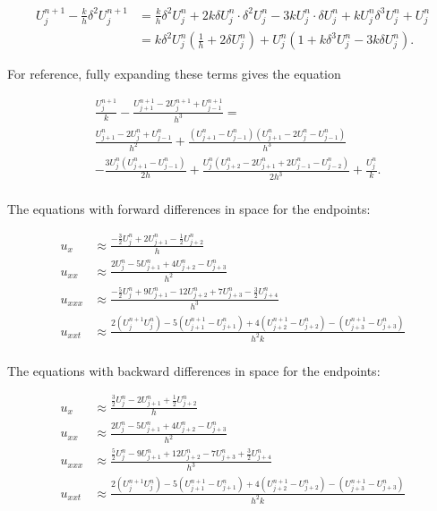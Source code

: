 \documentclass[fleqn]{article}
\begin{document}
\begin{align*}
U_j^{n+1} - \frac{k}{h} \delta^2 U_j^{n+1} &= \frac{k}{h} \delta^2 U_j^n + 2k\delta U_j^n \cdot \delta ^2U_j^n - 3 k U_j^n \cdot \delta U_j^n + k U_j^n \delta^3 U_j^n + U_j^n \\
&= k \delta^2 U_j^n \left( \frac{1}{h} + 2 \delta U_j^n \right) + U_j^n \left(1 + k \delta^3 U_j^n - 3 k \delta U_j^n \right).
\end{align*}

For reference, fully expanding these terms gives the equation

\begin{align*}
&\frac{U_{j}^{n+1}}{k} - \frac{U_{j+1}^{n+1}-2U_{j}^{n+1}+U_{j-1}^{n+1}}{h^{3}} = \\
&\frac{U_{j+1}^n - 2U_j^n + U_{j-1}^n}{h^2} +\frac{\left(U_{j+1}^n-U_{j-1}^n\right)\left(U_{j+1}^n-2U_{j}^n-U_{j-1}^n\right)}{h^{3}}\\
&-\frac{3U_{j}^n\left(U_{j+1}^n-U_{j-1}^n\right)}{2h} +\frac{U_{j}^n\left(U_{j+2}^n-2U_{j+1}^n+2U_{j-1}^n-U_{j-2}^n\right)}{2h^{3}} +\frac{U_{j}^n}{k}.\\
\end{align*}

\newpage
The equations with forward differences in space for the endpoints:

\begin{align*}
u_x &\approx \frac{-\frac{3}{2}U_j^n+2U_{j+1}^n-\frac{1}{2}U_{j+2}^n}{h} \\
u_{xx} &\approx \frac{2U_j^n-5U_{j+1}^n+4U_{j+2}^n-U_{j+3}^n}{h^{2}} \\
u_{xxx} &\approx \frac{-\frac{5}{2}U_j^n+9U_{j+1}^n-12U_{j+2}^n+7U_{j+3}^n-\frac{3}{2}U_{j+4}^n}{h^{3}} \\
u_{xxt} &\approx \frac{2\left(U_j^{n+1}U_j^n\right)-5\left(U_{j+1}^{n+1}-U_{j+1}^{n}\right)+4\left(U_{j+2}^{n+1}-U_{j+2}^n\right)-\left(U_{j+3}^{n+1}-U_{j+3}^n\right)}{h^{2}k} \\
\end{align*}

The equations with backward differences in space for the endpoints:

\begin{align*}
u_x &\approx \frac{\frac{3}{2}U_j^n-2U_{j+1}^n+\frac{1}{2}U_{j+2}^n}{h} \\
u_{xx} &\approx \frac{2U_j^n-5U_{j+1}^n+4U_{j+2}^n-U_{j+3}^n}{h^{2}} \\
u_{xxx} &\approx \frac{\frac{5}{2}U_j^n-9U_{j+1}^n+12U_{j+2}^n-7U_{j+3}^n+\frac{3}{2}U_{j+4}^n}{h^{3}} \\
u_{xxt} &\approx \frac{2\left(U_j^{n+1}U_j^n\right)-5\left(U_{j+1}^{n+1}-U_{j+1}^{n}\right)+4\left(U_{j+2}^{n+1}-U_{j+2}^n\right)-\left(U_{j+3}^{n+1}-U_{j+3}^n\right)}{h^{2}k} \\
\end{align*}
\end{document}
